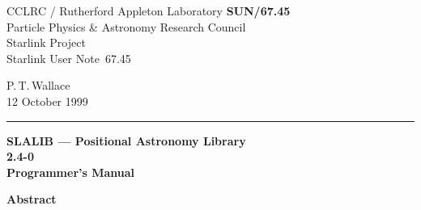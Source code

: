\documentclass[11pt,twoside]{article}
\newcommand{\stardoccategory}  {Starlink User Note}
\newcommand{\stardocinitials}  {SUN}
\newcommand{\stardocnumber}    {67.45}
\newcommand{\stardocauthors}   {P.\,T.\,Wallace}
\newcommand{\stardocdate}      {12 October 1999}
\newcommand{\stardoctitle}     {SLALIB --- Positional Astronomy Library}
\newcommand{\stardocversion}   {2.4-0}
\newcommand{\stardocmanual}    {Programmer's Manual}
\newcommand{\stardocname}{\stardocinitials /\stardocnumber}
\newenvironment{latexonly}{}{}
\begin{document}
\thispagestyle{empty}

\begin{latexonly}
   CCLRC / {\sc Rutherford Appleton Laboratory} \hfill {\bf \stardocname}\\
   {\large Particle Physics \& Astronomy Research Council}\\
   {\large Starlink Project\\}
   {\large \stardoccategory\ \stardocnumber}
   \begin{flushright}
   \stardocauthors\\
   \stardocdate
   \end{flushright}
   \vspace{-4mm}
   \rule{\textwidth}{0.5mm}
   \vspace{5mm}
   \begin{center}
   {\Huge\bf  \stardoctitle \\ [2.5ex]}
   {\LARGE\bf \stardocversion \\ [4ex]}
   {\Huge\bf  \stardocmanual}
   \end{center}
   \vspace{5mm}

   \vspace{10mm}
   \begin{center}
      {\Large\bf Abstract}
   \end{center}
\end{latexonly}
\end{document}
